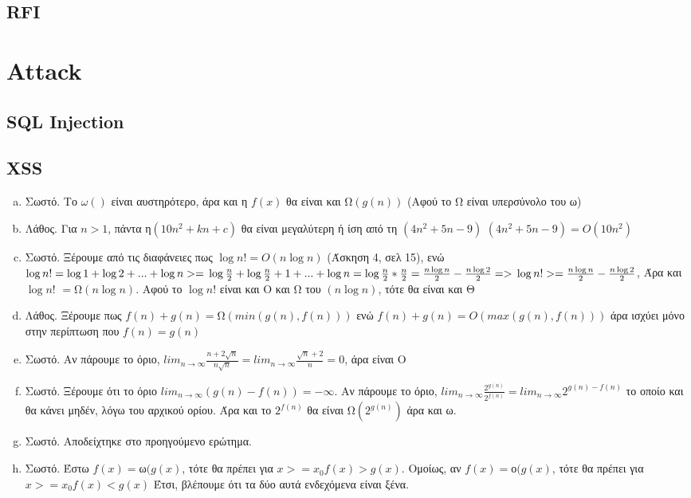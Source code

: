 \documentclass{article}
\begin{document}
\subsection*{\textlatin{RFI}}


\section*{\textlatin{Attack}}
\subsection*{\textlatin{SQL Injection}}



\subsection*{\textlatin{XSS}}


\begin{enumerate}[(a)]%
\item
Σωστό. Το $\omega{()}$ είναι αυστηρότερο, άρα και η $f(x)$ θα είναι και  Ω$(g(n))$ (Αφού το Ω είναι υπερσύνολο του ω)
\item
Λάθος. Για $n > 1$, πάντα η$(10n^2 + kn + c)$ θα είναι μεγαλύτερη ή ίση από τη $(4n^2 + 5n - 9)$ $(4n^2 + 5n - 9) = O(10n^2)$ 
\item
Σωστό. Ξέρουμε από τις διαφάνειες πως $\log{n!} = O(n\log{n})$ (Άσκηση 4, σελ 15), ενώ $\log{n!} = \log{1} + \log{2} + ... + \log{n} >= \\\\
 \log{\frac{n}{2}} + \log{\frac{n}{2}+1} + ... + \log{n} = \log{\frac{n}{2}}*\frac{n}{2} = \frac{n\log{n}}{2}-\frac{n\log{2}}{2} =>\\\\
\log{n!} >=  \frac{n\log{n}}{2}-\frac{n\log{2}}{2}$, Άρα και $\log{n!}$ $=$Ω$(n\log{n})$. Αφού  το $\log{n!}$ είναι και Ο και Ω του $(n\log{n})$, τότε θα είναι και Θ
\item
Λάθος. Ξέρουμε πως $f(n) + g(n) = $Ω$(min(g(n),f(n)))$ ενώ $f(n) + g(n) = O(max(g(n),f(n)))$ άρα ισχύει μόνο στην περίπτωση που $f(n) = g(n)$
\item
Σωστό. Αν πάρουμε το όριο, $ lim_{n\to\infty} \frac{n+2\sqrt{n}}{n\sqrt{n}} = lim_{n\to\infty} \frac{\sqrt{n}+2}{n} = 0$, άρα είναι O
\item
Σωστό. Ξέρουμε ότι το όριο $ lim_{n\to\infty} (g(n) - f(n)) = -\infty$. Αν πάρουμε το όριο, $ lim_{n\to\infty} \frac{2^{g(n)}}{2^{f(n)}} =  lim_{n\to\infty} 2^{g(n)-f(n)}$ το οποίο και θα κάνει μηδέν, λόγω του αρχικού ορίου. Άρα και το $2^{f(n)}$ θα είναι Ω$(2^{g(n)})$ άρα και ω.
\item
Σωστό. Αποδείχτηκε στο προηγούμενο ερώτημα.
\item
Σωστό. Έστω $f(x) = $ω$(g(x)$, τότε θα πρέπει για $x>=x_0 f(x) > g(x)$. Ομοίως, αν $f(x) = $ο$(g(x)$, τότε θα πρέπει για $x>=x_0 f(x) < g(x)$ Έτσι, βλέπουμε ότι τα δύο αυτά ενδεχόμενα είναι ξένα.

\end{enumerate}
\end{document}
